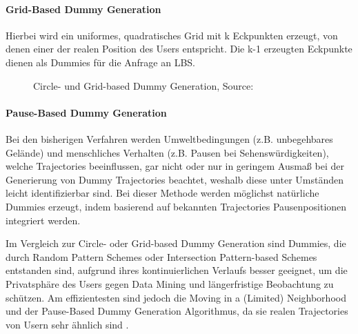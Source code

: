 	\paragraph{Grid-Based Dummy Generation \cite{Lu2008}} Hierbei wird ein uniformes, quadratisches Grid mit k Eckpunkten erzeugt, von denen einer der realen Position des Users entspricht. Die k-1 erzeugten Eckpunkte dienen als Dummies für die Anfrage an LBS.
	\begin{figure}[!h]
		\centering
		\caption{Circle- und Grid-based Dummy Generation, Source: \protect\cite{Lu2008}}
		\label{fig_Lu2008}
	\end{figure}
	\paragraph{Pause-Based Dummy Generation \cite{Kato2012}}
	Bei den bisherigen Verfahren werden Umweltbedingungen (z.B. unbegehbares Gelände) und menschliches Verhalten (z.B. Pausen bei Sehenswürdigkeiten), welche Trajectories beeinflussen, gar nicht oder nur in geringem Ausmaß bei der Generierung von Dummy Trajectories beachtet, weshalb diese unter Umständen leicht identifizierbar sind. Bei dieser Methode werden möglichst natürliche Dummies erzeugt, indem basierend auf bekannten Trajectories Pausenpositionen integriert werden.

Im Vergleich zur Circle- oder Grid-based Dummy Generation sind Dummies, die durch Random Pattern Schemes oder Intersection Pattern-based Schemes entstanden sind, aufgrund ihres kontinuierlichen Verlaufs besser geeignet, um die Privatsphäre des Users gegen Data Mining und längerfristige Beobachtung zu schützen. Am effizientesten sind jedoch die Moving in a (Limited) Neighborhood und der Pause-Based Dummy Generation Algorithmus, da sie realen Trajectories von Usern sehr ähnlich sind \cite{Kukkapalli2012}. 